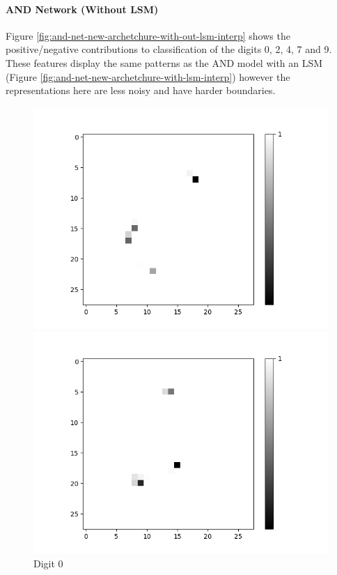 \paragraph{AND Network (Without LSM)}
Figure \ref{fig:and-net-new-archetchure-with-out-lsm-interp} shows the positive/negative contributions to classification of the digits 0, 2, 4, 7 and 9. These features display the same patterns as the AND model with an LSM (Figure \ref{fig:and-net-new-archetchure-with-lsm-interp}) however the representations here are less noisy and have harder boundaries.

\begin{figure}[H]
	\centering
	\begin{minipage}[b]{0.19\textwidth}
		\captionsetup{labelformat=empty}
		\includegraphics[width=\textwidth]{AND(NO-LSM)/Positive/Layer0-Neuron-0.png}
		\caption{Digit 0}
		\label{fig:cnf-descrete-generalizatiion}
	\end{minipage}
	\begin{minipage}[b]{0.19\textwidth}
		\captionsetup{labelformat=empty}
		\includegraphics[width=\textwidth]{AND(NO-LSM)/Positive/Layer0-Neuron-2.png}

\end{minipage}
\end{figure}
